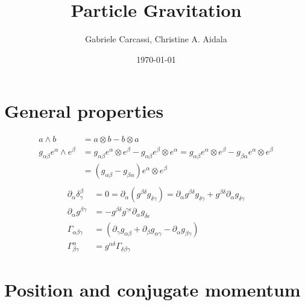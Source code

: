 \documentclass[11pt]{article}
\begin{document}
\title{Particle Gravitation}
\author{Gabriele Carcassi, Christine A. Aidala}



\date{\today}

\maketitle

\begin{abstract}
\end{abstract}

\tableofcontents
\newpage

\section{General properties}
\begin{equation}
\begin{aligned}
a \wedge b &= a \otimes b - b \otimes a \\
g_{\alpha\beta} e^\alpha \wedge e^\beta &= g_{\alpha\beta} e^\alpha \otimes e^\beta - g_{\alpha\beta} e^\beta \otimes e^\alpha = g_{\alpha\beta} e^\alpha \otimes e^\beta - g_{\beta\alpha} e^\alpha \otimes e^\beta \\
&= (g_{\alpha\beta} - g_{\beta\alpha}) e^\alpha \otimes e^\beta \\
\end{aligned}
\end{equation}
\begin{equation}
\begin{aligned}
\partial_\alpha \delta^\beta_\gamma &= 0 = \partial_\alpha ( g^{\beta \delta} g_{\delta \gamma} ) = \partial_\alpha g^{\beta \delta} g_{\delta \gamma} + g^{\beta \delta} \partial_\alpha g_{\delta \gamma} \\
\partial_\alpha g^{\beta \gamma} &= - g^{\beta \delta} g^{\gamma \epsilon} \partial_\alpha g_{\delta \epsilon} \\
\Gamma_{\alpha \beta \gamma} &= (\partial_\gamma g_{\alpha\beta} + \partial_\beta g_{\alpha\gamma} - \partial_\alpha g_{\beta\gamma}) \\
\Gamma^\alpha_{\beta\gamma} &= g^{\alpha \delta} \Gamma_{\delta\beta\gamma}
\end{aligned}
\end{equation}

\section{Position and conjugate momentum}
\end{document}
